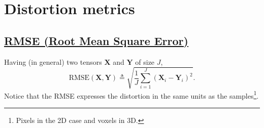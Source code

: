 \documentclass{article}
\begin{document}

  
\section{Distortion metrics}

\subsection{\href{https://en.wikipedia.org/wiki/Root_mean_square_deviation}{RMSE (Root Mean
    Square Error)}}

Having (in general) two tensors $\mathbf{X}$ and $\mathbf{Y}$ of size
$J$,
\begin{equation}
  \text{RMSE}(\mathbf{X},\mathbf{Y}) \triangleq \sqrt{\frac{1}{J}\sum_{i=1}^J(\mathbf{X}_i - \mathbf{Y}_i)^2}.
\end{equation}
Notice that the RMSE expresses the distortion in the same units as the
samples\footnote{Pixels in the 2D case and voxels in 3D.}.
\end{document}

